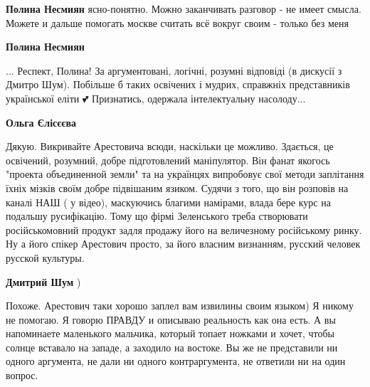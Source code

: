 \begin{itemize}
\begin{itemize}
\textbf{Полина Несмиян} ясно-понятно. Можно заканчивать разговор - не имеет
смысла. Можете и дальше помогать москве считать всё вокруг своим - только без
меня

 
\textbf{Полина Несмиян} 

... Респект, Полина! За аргументовані, логічні, розумні
відповіді (в дискусії з Дмитро Шум). Побільше б таких освічених і мудрих,
справжніх представників української еліти 💕 Признатись, одержала
інтелектуальну насолоду...

 
\textbf{Ольга Єлісєєва} 

Дякую. Викривайте Арестовича всюди, наскільки це
можливо. Здається, це освічений, розумний, добре підготовлений маніпулятор. Він
фанат якогось "проекта объединенной земли" та на українцях випробовує свої
методи заплітання їхніх мізків своїм добре підвішаним язиком. Судячи з того, що
він розповів на каналі НАШ ( у відео), маскуючись благими намірами, влада бере
курс на подальшу русифікацію. Тому що фірмі Зеленського треба створювати
російськомовний продукт задля продажу його на величезному російському ринку. Ну
а його спікер Арестович просто, за його власним визнанням, русский человек
русской культуры.

 
\textbf{Дмитрий Шум} ) 

Похоже. Арестович таки хорошо заплел вам извилины своим языком) Я никому не
помогаю. Я говорю ПРАВДУ и описываю реальность как она есть. А вы напоминаете
маленького мальчика, который топает ножками и хочет, чтобы солнце вставало на
западе, а заходило на востоке. Вы же не представили ни одного аргумента, не
дали ни одного контраргумента, не ответили ни на один вопрос.


\end{itemize}
\end{itemize}
